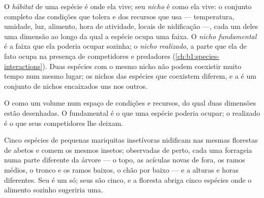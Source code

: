 \begin{definition}\label{def:b1:ecosystem-organization:niche}
O \emph{hábitat} de uma espécie é onde ela vive; seu \emph{nicho} é
como ela vive: o conjunto completo das condições que tolera e dos
recursos que usa --- temperatura, umidade, luz, alimento, hora de
atividade, locais de nidificação ---, cada um deles uma dimensão ao
longo da qual a espécie ocupa uma faixa. O \emph{nicho fundamental} é
a faixa que ela poderia ocupar sozinha; o \emph{nicho realizado}, a
parte que ela de fato ocupa na presença de competidores e predadores
(\cref{ch:b1:species-interactions}). Duas espécies com o mesmo nicho
não podem coexistir muito tempo num mesmo lugar; os nichos das
espécies que coexistem diferem, e a  é um conjunto de nichos
encaixados uns nos outros.
\end{definition}

\begin{omfigure}

{\small O  como um volume num espaço de condições e recursos, do
qual duas dimensões estão desenhadas. O  fundamental é o que uma
espécie poderia ocupar; o  realizado é o que seus competidores
lhe deixam.}
\end{omfigure}

\begin{example}\label{ex:b1:ecosystem-organization:warblers}
Cinco espécies de pequenas mariquitas insetívoras nidificam nas mesmas
florestas de abetos e comem os mesmos insetos; observadas de perto,
cada uma forrageia numa parte diferente da árvore --- o topo, as
acículas novas de fora, os ramos médios, o tronco e os ramos baixos, o
chão por baixo --- e a alturas e horas diferentes. Seu  é um só;
seus  são cinco, e a floresta abriga cinco espécies onde o
alimento sozinho sugeriria uma.
\end{example}

